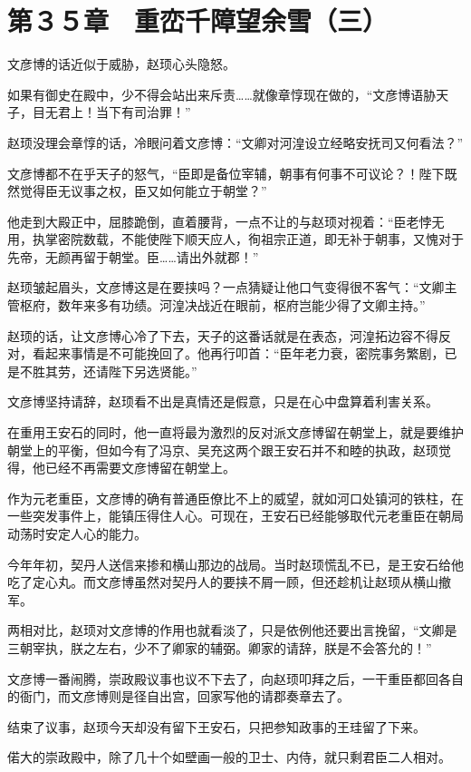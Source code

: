 \section{第３５章　重峦千障望余雪（三）}

文彦博的话近似于威胁，赵顼心头隐怒。

如果有御史在殿中，少不得会站出来斥责……就像章惇现在做的，“文彦博语胁天子，目无君上！当下有司治罪！”

赵顼没理会章惇的话，冷眼问着文彦博：“文卿对河湟设立经略安抚司又何看法？”

文彦博都不在乎天子的怒气，“臣即是备位宰辅，朝事有何事不可议论？！陛下既然觉得臣无议事之权，臣又如何能立于朝堂？”

他走到大殿正中，屈膝跪倒，直着腰背，一点不让的与赵顼对视着：“臣老悖无用，执掌密院数载，不能使陛下顺天应人，徇祖宗正道，即无补于朝事，又愧对于先帝，无颜再留于朝堂。臣……请出外就郡！”

赵顼皱起眉头，文彦博这是在要挟吗？一点猜疑让他口气变得很不客气：“文卿主管枢府，数年来多有功绩。河湟决战近在眼前，枢府岂能少得了文卿主持。”

赵顼的话，让文彦博心冷了下去，天子的这番话就是在表态，河湟拓边容不得反对，看起来事情是不可能挽回了。他再行叩首：“臣年老力衰，密院事务繁剧，已是不胜其劳，还请陛下另选贤能。”

文彦博坚持请辞，赵顼看不出是真情还是假意，只是在心中盘算着利害关系。

在重用王安石的同时，他一直将最为激烈的反对派文彦博留在朝堂上，就是要维护朝堂上的平衡，但如今有了冯京、吴充这两个跟王安石并不和睦的执政，赵顼觉得，他已经不再需要文彦博留在朝堂上。

作为元老重臣，文彦博的确有普通臣僚比不上的威望，就如河口处镇河的铁柱，在一些突发事件上，能镇压得住人心。可现在，王安石已经能够取代元老重臣在朝局动荡时安定人心的能力。

今年年初，契丹人送信来掺和横山那边的战局。当时赵顼慌乱不已，是王安石给他吃了定心丸。而文彦博虽然对契丹人的要挟不屑一顾，但还趁机让赵顼从横山撤军。

两相对比，赵顼对文彦博的作用也就看淡了，只是依例他还要出言挽留，“文卿是三朝宰执，朕之左右，少不了卿家的辅弼。卿家的请辞，朕是不会答允的！”

文彦博一番闹腾，崇政殿议事也议不下去了，向赵顼叩拜之后，一干重臣都回各自的衙门，而文彦博则是径自出宫，回家写他的请郡奏章去了。

结束了议事，赵顼今天却没有留下王安石，只把参知政事的王珪留了下来。

偌大的崇政殿中，除了几十个如壁画一般的卫士、内侍，就只剩君臣二人相对。

